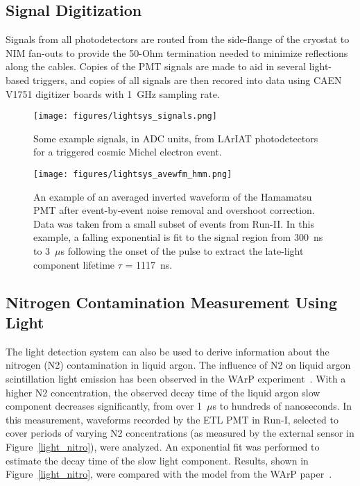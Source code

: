 \subsection*{Signal Digitization}

Signals from all photodetectors are routed from the side-flange of the cryostat to NIM fan-outs to provide the 50-Ohm termination needed to minimize reflections along the cables. Copies of the PMT signals are made to aid in several light-based triggers, and copies of all signals are then recored into data using CAEN V1751 digitizer boards with 1~GHz sampling rate.

\begin{figure}
\centering
\texttt{[image: figures/lightsys\_signals.png]}
\caption{Some example signals, in ADC units, from LArIAT photodetectors for a triggered cosmic Michel electron event.}
\label{lightsys_signals}
\end{figure}
\begin{figure}
\centering
\texttt{[image: figures/lightsys\_avewfm\_hmm.png]}
\caption{\label{wfm_hmmpmt}An example of an averaged inverted waveform of the Hamamatsu PMT after event-by-event noise removal and overshoot correction.  Data was taken from a small subset of events from Run-II.  In this example, a falling exponential is fit to the signal region from 300~ns to 3~$\mu$s following the onset of the pulse to extract the late-light component lifetime $\tau$ = 1117~ns.}
\end{figure}

\subsection*{Nitrogen Contamination Measurement Using Light}

The light detection system can also be used to derive information about the nitrogen (N2) contamination in liquid argon. The influence of N2 on liquid argon scintillation light emission has been observed in the WArP experiment~\cite{WARP-nitrogen}. With a higher N2 concentration, the observed decay time of the liquid argon slow component decreases significantly, from over 1~$\mu$s to hundreds of nanoseconds. In this measurement, waveforms recorded by the ETL PMT in Run-I, selected to cover periods of varying N2 concentrations (as measured by the external sensor in Figure~\ref{light_nitro}), were analyzed. An exponential fit was performed to estimate the decay time of the slow light component. Results, shown in Figure~\ref{light_nitro}, were compared with the model from the WArP paper~\cite{WARP-nitrogen}.

